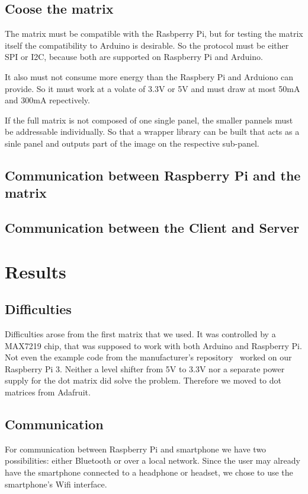 \documentclass[conference]{IEEEtran}
\begin{document}
\subsection{Coose the matrix}
The matrix must be compatible with the Rasbperry Pi, but for testing the matrix itself the compatibility to Arduino is desirable. So the protocol must be either SPI or I2C, because both are supported on Raspberry Pi and Arduino.

It also must not consume more energy than the Raspbery Pi and Arduiono can provide. So it must work at a volate of 3.3V or 5V and must draw at most 50mA and 300mA repectively\cite{b0}.

If the full matrix is not composed of one single panel, the smaller pannels must be addressable individually. So that a wrapper library can be built that acts as a sinle panel and outputs part of the image on the respective sub-panel.

\subsection{Communication between Raspberry Pi and the matrix}

\subsection{Communication between the Client and Server}


\section{Results}

\subsection{Difficulties}
Difficulties arose from the first matrix that we used. It was controlled by a MAX7219 chip, that was supposed to work with both Arduino and Raspberry Pi. Not even the example code from the manufacturer's repository~\cite{b1} worked on our Raspberry Pi 3. Neither a level shifter from 5V to 3.3V nor a separate power supply for the dot matrix did solve the problem. Therefore we moved to dot matrices from Adafruit\cite{b2}.

\subsection{Communication}
For communication between Raspberry Pi and smartphone we have two possibilities: either Bluetooth or over a local network. Since the user may already have the smartphone connected to a headphone or headset, we chose to use the smartphone's Wifi interface.
\end{document}
